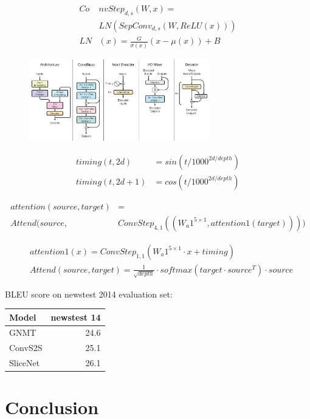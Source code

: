 \documentclass[a4paper]{article}
\begin{document}
\begin{align*}
  Co&nvStep_{d,s}(W, x) = \\
  &LN(SepConv_{d,s}(W, ReLU(x))) \\
  LN&(x) = \frac{G}{\sigma(x)}(x - \mu(x)) + B
\end{align*}


\begin{figure}
  \center
  \includegraphics[width=0.7\textwidth]{img/SN}
\end{figure}


\begin{align*}
  timing(t, 2d) &= sin(t/1000^{2d/depth}) \\
  timing(t, 2d + 1) &= cos(t/1000^{2d/depth})
\end{align*}


\begin{align*}
  attention(source, target) &= \\
    Attend(source, &ConvStep_{4,1}((W_a1^{5 \times 1}, attention1(target))))
\end{align*}


\begin{align*}
  &attention1(x) = ConvStep_{1,1}(W_a1^{5 \times 1} \cdot x + timing) \\
  &Attend(source, target) = \frac{1}{\sqrt{depth}} \cdot
    softmax(target \cdot source^T) \cdot source
\end{align*}


BLEU score on newstest 2014 evaluation set:
\begin{center}
  \begin{tabular}{lr}
  \hline
    Model & newstest 14 \\
  \hline
    GNMT & 24.6 \\
    ConvS2S & 25.1 \\
    SliceNet & 26.1 \\
  \hline
  \end{tabular}
\end{center}


\section{Conclusion}




\end{document}
